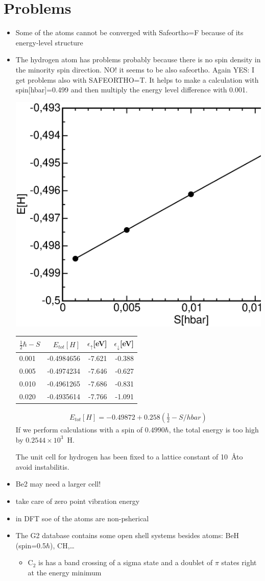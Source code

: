 \documentclass[a4paper,10pt]{report}
\begin{document}
\section{Problems}
\begin{itemize}
\item Some of the atoms cannot be converged with Safeortho=F because of 
its energy-level structure
\item The hydrogen atom has problems probably because there is no spin
density in the minority spin direction. NO! it seems to be also
safeortho. Again YES: I get problems also with SAFEORTHO=T. It helps
to make a calculation with spin[hbar]=0.499 and then multiply the
energy level difference with 0.001. 
\begin{center}
\includegraphics[width=0.5\linewidth,clip=t]{Figs/hydrogenetot.eps}
\begin{tabular}{|l|r|r|r|}
\hline
$\frac{1}{2}\hbar-S$ & $E_{tot}[H]$ & $\epsilon_\uparrow$[eV]& $\epsilon_\downarrow$[eV] \\
\hline
0.001 &  -0.4984656 &  -7.621&   -0.388 \\
0.005 &  -0.4974234 &  -7.646&   -0.627\\ 
0.010 &  -0.4961265 &  -7.686&   -0.831 \\
0.020 &  -0.4935614 &  -7.766&   -1.091 \\
\hline
\end{tabular}
\end{center}
\begin{eqnarray*}
E_{tot}[H]=-0.49872+0.258(\frac{1}{2}-S/hbar)
\end{eqnarray*}
If we perform calculations with a spin of $0.4990 \hbar$, the total
energy is too high by $0.2544\times 10^3$~H.

The unit cell for hydrogen has been fixed to a lattice constant of
10~\AA to avoid instabilitis.

\item Be2 may need a larger cell!
\item take care of zero point vibration energy
\item in DFT soe of the atoms are non-psherical
\item The G2 database contains some open shell systems besides atoms:
BeH (spin=0.5$\hbar$), CH,\ldots
\begin{itemize}
\item C$_2$ is has a band crossing of a sigma state and a doublet of
$\pi$ states right at the energy minimum
\end{itemize}
\end{itemize}
\end{document}
